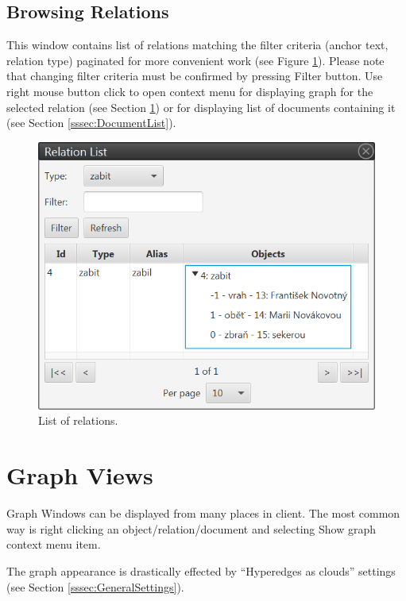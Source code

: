 \subsection{Browsing Relations}

This window contains list of relations matching the filter criteria (anchor
text, relation type) paginated for more convenient work (see Figure
\ref{fig:RelationList}). Please note that changing filter criteria must be
confirmed by pressing Filter button. Use right mouse button click to open
context menu for displaying graph for the selected relation (see Section
\ref{ssec:Graphs}) or for displaying list of documents containing it (see
Section \ref{sssec:DocumentList}).

\begin{figure}[!htb]
        \centering
        \includegraphics[width=\textwidth]{Images/relationlist}
        \caption{List of relations.}
        \label{fig:RelationList}
\end{figure}

\section{Graph Views}
\label{ssec:Graphs}

Graph Windows can be displayed from many places in \textan{} client. The most
common way is right clicking an object/relation/document and selecting Show
graph context menu item.

The graph appearance is drastically effected by ``Hyperedges as clouds'' settings
(see Section \ref{sssec:GeneralSettings}).

